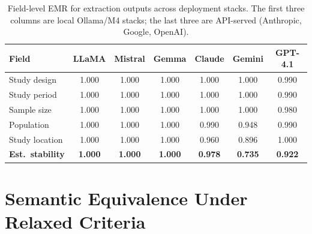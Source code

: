 \documentclass[11pt]{article}
\newenvironment{fittab}{\begin{lrbox}{\fittabbox}}{\end{lrbox}%
  \ifdim\wd\fittabbox>\linewidth\resizebox{\linewidth}{!}{\usebox{\fittabbox}}\else\usebox{\fittabbox}\fi}
\begin{document}
\begin{table}[htbp]
\centering
\caption{Field-level EMR for extraction outputs across deployment stacks. The first three columns are local Ollama/M4 stacks; the last three are API-served (Anthropic, Google, OpenAI).}
\label{tab:fields}
\begin{fittab}\begin{tabular}{lcccccc}
\toprule
\textbf{Field} & \textbf{LLaMA} & \textbf{Mistral} & \textbf{Gemma} & \textbf{Claude} & \textbf{Gemini} & \textbf{GPT-4.1} \\
\midrule
Study design    & 1.000 & 1.000 & 1.000 & 1.000 & 1.000 & 0.990 \\
Study period    & 1.000 & 1.000 & 1.000 & 1.000 & 1.000 & 0.990 \\
Sample size     & 1.000 & 1.000 & 1.000 & 1.000 & 1.000 & 0.980 \\
Population      & 1.000 & 1.000 & 1.000 & 0.990 & 0.948 & 0.990 \\
Study location  & 1.000 & 1.000 & 1.000 & 0.960 & 0.896 & 1.000 \\
\midrule
\textbf{Est.\ stability} & \textbf{1.000} & \textbf{1.000} & \textbf{1.000} & \textbf{0.978} & \textbf{0.735} & \textbf{0.922} \\
\bottomrule
\end{tabular}\end{fittab}
\end{table}


\section{Semantic Equivalence Under Relaxed Criteria}
\end{document}
